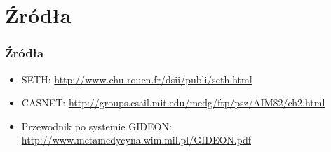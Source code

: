 \section{Źródła}

\begin{frame}
    \frametitle{Źródła}
    \begin{itemize}
        \item SETH: \url{http://www.chu-rouen.fr/dsii/publi/seth.html}
        \item CASNET: \url{http://groups.csail.mit.edu/medg/ftp/psz/AIM82/ch2.html}
        \item Przewodnik po systemie GIDEON:
        \url{http://www.metamedycyna.wim.mil.pl/GIDEON.pdf}
    \end{itemize}
\end{frame}

